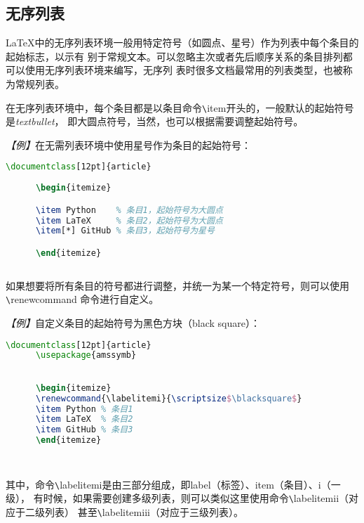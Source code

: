 {\subsection{无序列表}
LaTeX中的无序列表环境一般用特定符号（如圆点、星号）作为列表中每个条目的起始标志，以示有
别于常规文本。可以忽略主次或者先后顺序关系的条目排列都可以使用无序列表环境来编写，无序列
表时很多文档最常用的列表类型，也被称为常规列表。

在无序列表环境中，每个条目都是以条目命令\verb|\|item开头的，一般默认的起始符号是\emph{textbullet}，
即大圆点符号，当然，也可以根据需要调整起始符号。

\emph{【例】}在无需列表环境中使用星号作为条目的起始符号：
\begin{lstlisting}[language=TeX]
      \documentclass[12pt]{article}
      
      \begin{itemize}

      \item Python    % 条目1，起始符号为大圆点
      \item LaTeX     % 条目2，起始符号为大圆点
      \item[*] GitHub % 条目3，起始符号为星号

      \end{itemize}
      
\end{lstlisting}

如果想要将所有条目的符号都进行调整，并统一为某一个特定符号，则可以使用\verb|\|renewcommand
命令进行自定义。

\emph{【例】}自定义条目的起始符号为黑色方块（black square）：
\begin{lstlisting}[language=TeX]
      \documentclass[12pt]{article}
      \usepackage{amssymb}
      

      \begin{itemize}
      \renewcommand{\labelitemi}{\scriptsize$\blacksquare$}
      \item Python % 条目1
      \item LaTeX  % 条目2
      \item GitHub % 条目3
      \end{itemize}

      
\end{lstlisting}

其中，命令\verb|\|labelitemi是由三部分组成，即label（标签）、item（条目）、i（一级），
有时候，如果需要创建多级列表，则可以类似这里使用命令\verb|\|labelitemii（对应于二级列表）
甚至\verb|\|labelitemiii（对应于三级列表）。

}
